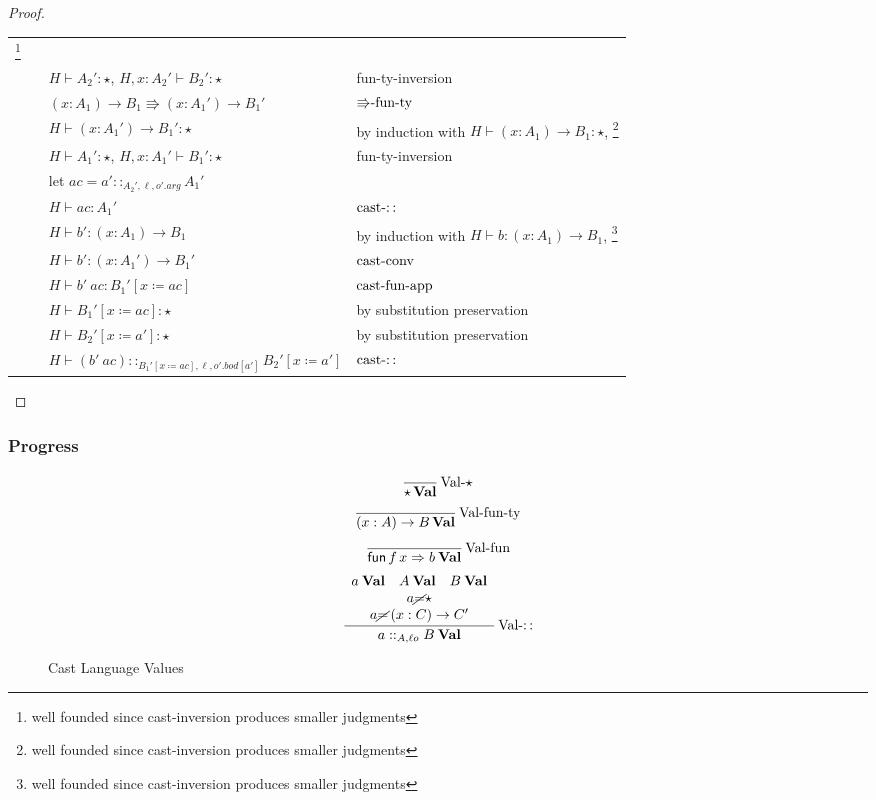 \begin{proof}
\begin{tabular}{llll}
\footnote{well founded since cast-inversion produces smaller judgments}\tabularnewline
 &  & $H\vdash A_{2}':\star$, $H,x:A_{2}'\vdash B_{2}':\star$ & fun-ty-inversion\tabularnewline
 &  & $\left(x:A_{1}\right)\rightarrow B_{1}\Rrightarrow\left(x:A_{1}'\right)\rightarrow B_{1}'$ & $\textrm{\ensuremath{\Rrightarrow}-fun-ty}$\tabularnewline
 &  & $H\vdash\left(x:A_{1}'\right)\rightarrow B_{1}':\star$ & by induction with $H\vdash\left(x:A_{1}\right)\rightarrow B_{1}:\star$,
\footnote{well founded since cast-inversion produces smaller judgments}\tabularnewline
 &  & $H\vdash A_{1}':\star$, $H,x:A_{1}'\vdash B_{1}':\star$ & fun-ty-inversion\tabularnewline
 &  & let $ac=a'::_{A_{2}',\ell,o'.arg}A_{1}'$ & \tabularnewline
 &  & $H\vdash ac:A_{1}'$ & $\operatorname{cast-::}$\tabularnewline
 &  & $H\vdash b':\left(x:A_{1}\right)\rightarrow B_{1}$ & by induction with $H\vdash b:\left(x:A_{1}\right)\rightarrow B_{1}$,
\footnote{well founded since cast-inversion produces smaller judgments}\tabularnewline
 &  & $H\vdash b':\left(x:A_{1}'\right)\rightarrow B_{1}'$ & $\operatorname{cast-conv}$\tabularnewline
 &  & $H\vdash b'\ ac:B_{1}'\left[x\coloneqq ac\right]$ & $\operatorname{cast-fun-app}$\tabularnewline
 &  & $H\vdash B_{1}'\left[x\coloneqq ac\right]:\star$ & by substitution preservation\tabularnewline
 &  & $H\vdash B_{2}'\left[x\coloneqq a'\right]:\star$ & by substitution preservation\tabularnewline
 &  & $H\vdash\left(b'\ ac\right)::_{B_{1}'\left[x\coloneqq ac\right],\ensuremath{\ell},o'.bod[a']}B_{2}'\left[x\coloneqq a'\right]$ & $\operatorname{cast-::}$\tabularnewline
\end{tabular}
\end{proof}


\subsubsection{Progress}

\begin{figure}
\[
\frac{\,}{\star\,\textbf{Val}}\operatorname{Val-\star}
\]
\[
\frac{\,}{\left(x:A\right)\rightarrow B\,\textbf{Val}}\operatorname{Val-fun-ty}
\]
\[
\frac{\,}{\mathsf{fun}\,f\,x\Rightarrow b\:\textbf{Val}}\operatorname{Val-fun}
\]
\[
\frac{\begin{array}{c}
a\:\textbf{Val}\quad A\:\textbf{Val}\quad B\:\textbf{Val}\\
a\cancel{=}\star\\
a\cancel{=}\left(x:C\right)\rightarrow C'
\end{array}}{a::_{A,\ell o}B\:\textbf{Val}}\operatorname{Val-::}
\]
\caption{Cast Language Values}
\label{fig:cast-val}
\end{figure}

